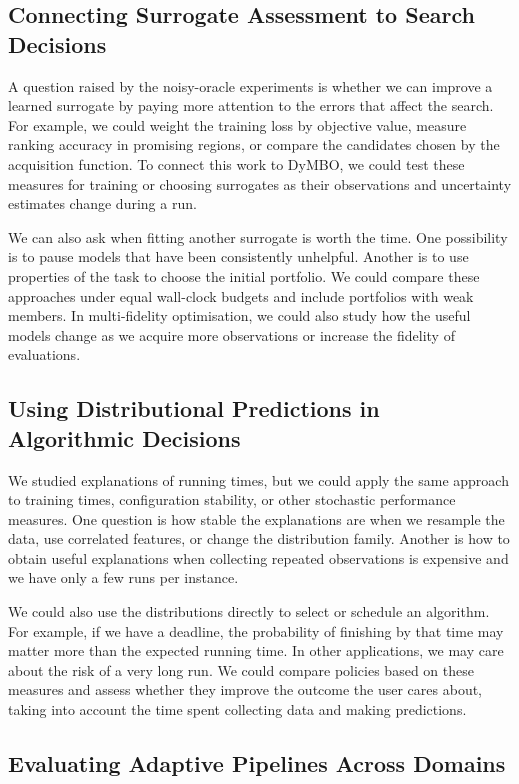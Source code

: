 \subsection{Connecting Surrogate Assessment to Search Decisions}

A question raised by the noisy-oracle experiments is whether we can improve a learned surrogate by paying more attention to the errors that affect the search. For example, we could weight the training loss by objective value, measure ranking accuracy in promising regions, or compare the candidates chosen by the acquisition function. To connect this work to DyMBO, we could test these measures for training or choosing surrogates as their observations and uncertainty estimates change during a run.

We can also ask when fitting another surrogate is worth the time. One possibility is to pause models that have been consistently unhelpful. Another is to use properties of the task to choose the initial portfolio. We could compare these approaches under equal wall-clock budgets and include portfolios with weak members. In multi-fidelity optimisation, we could also study how the useful models change as we acquire more observations or increase the fidelity of evaluations.

\subsection{Using Distributional Predictions in Algorithmic Decisions}

We studied explanations of running times, but we could apply the same approach to training times, configuration stability, or other stochastic performance measures. One question is how stable the explanations are when we resample the data, use correlated features, or change the distribution family. Another is how to obtain useful explanations when collecting repeated observations is expensive and we have only a few runs per instance.

We could also use the distributions directly to select or schedule an algorithm. For example, if we have a deadline, the probability of finishing by that time may matter more than the expected running time. In other applications, we may care about the risk of a very long run. We could compare policies based on these measures and assess whether they improve the outcome the user cares about, taking into account the time spent collecting data and making predictions.

\subsection{Evaluating Adaptive Pipelines Across Domains}

